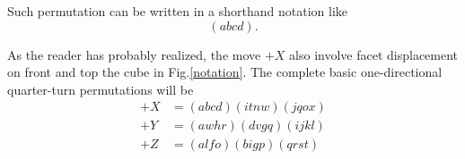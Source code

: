 \documentclass[a4paper,12pt]{article}
\begin{document}
Such permutation can be written in a shorthand notation like
\begin{equation}
(abcd).
\end{equation}

As the reader has probably realized, the move $+X$ also involve facet
displacement on front and top the cube in Fig.\ref{notation}. The complete basic
one-directional quarter-turn permutations will be
\begin{align}
+X &=(abcd)(itnw)(jqox)\\
+Y &=(awhr)(dvgq)(ijkl)\\
+Z &=(alfo)(bigp)(qrst)
\end{align}
\end{document}

